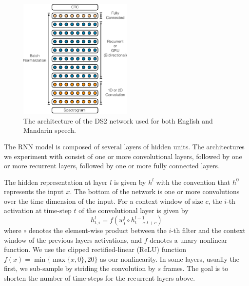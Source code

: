 \begin{figure}
    \centering
    \includegraphics[width=0.5\textwidth]{deepspeech2/figures/ds2_architecture.pdf}
    \caption{The architecture of the DS2 network used for both English and
             Mandarin speech.}
    \label{fig:deepspeech2:ds2_network}
\end{figure}

The RNN model is composed of several layers of hidden units. The architectures
we experiment with consist of one or more convolutional layers, followed by one
or more recurrent layers, followed by one or more fully connected layers.

The hidden representation at layer $l$ is given by $h^l$ with the convention
that $h^0$ represents the input $x$. The bottom of the network is one or more
convolutions over the time dimension of the input. For a context window of size
$c$, the $i$-th activation at time-step $t$ of the convolutional layer is given
by
\begin{equation*}
h_{t,i}^l = f( w_i^l \circ h^{l-1}_{t-c:t+c} )
\end{equation*}
where $\circ$ denotes the element-wise product between the $i$-th filter and
the context window of the previous layers activations, and $f$ denotes a unary
nonlinear function. We use the clipped rectified-linear (ReLU) function $f(x) =
\min\{\max\{x, 0\},20\}$ as our nonlinearity. In some layers, usually the
first, we sub-sample by striding the convolution by $s$ frames. The goal is to
shorten the number of time-steps for the recurrent layers above.

